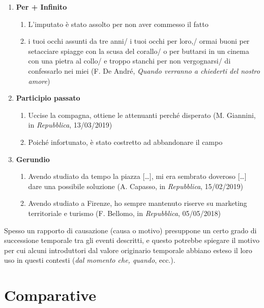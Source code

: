 \documentclass[
  a4paper,
  twoside,
  11pt,
  chapterprefix=false,
  bibliography=totocnumbered,
  listof=flat]{scrbook}
\providecommand{\tightlist}{%
  \setlength{\itemsep}{0pt}\setlength{\parskip}{0pt}}
\begin{document}
\begin{enumerate}
\def\labelenumi{(\arabic{enumi})}
\setcounter{enumi}{74}
\tightlist
\item
  \textbf{Per + Infinito}

  \begin{enumerate}
  \def\labelenumii{\alph{enumii}.}
  \tightlist
  \item
    L'imputato è stato assolto per non aver commesso il fatto
  \item
    i tuoi occhi assunti da tre anni/ i tuoi occhi per loro,/ ormai buoni per setacciare spiagge con la scusa del corallo/ o per buttarsi in un cinema con una pietra al collo/ e troppo stanchi per non vergognarsi/ di confessarlo nei miei (F. De André, \emph{Quando verranno a chiederti del nostro amore})
  \end{enumerate}
\item
  \textbf{Participio passato}

  \begin{enumerate}
  \def\labelenumii{\alph{enumii}.}
  \tightlist
  \item
    Uccise la compagna, ottiene le attenuanti perché disperato (M. Giannini, in \emph{Repubblica}, 13/03/2019)
  \item
    Poiché infortunato, è stato costretto ad abbandonare il campo
  \end{enumerate}
\item
  \textbf{Gerundio}

  \begin{enumerate}
  \def\labelenumii{\alph{enumii}.}
  \tightlist
  \item
    Avendo studiato da tempo la piazza {[}\ldots{]}, mi era sembrato doveroso {[}\ldots{]} dare una possibile soluzione (A. Capasso, in \emph{Repubblica}, 15/02/2019)
  \item
    Avendo studiato a Firenze, ho sempre mantenuto riserve su marketing territoriale e turismo (F. Bellomo, in \emph{Repubblica}, 05/05/2018)
  \end{enumerate}
\end{enumerate}

Spesso un rapporto di causazione (causa o motivo) presuppone un certo grado di successione temporale tra gli eventi descritti, e questo potrebbe spiegare il motivo per cui alcuni introduttori dal valore originario temporale abbiano esteso il loro uso in questi contesti (\emph{dal momento che, quando}, ecc.).

\hypertarget{comparative}{%
\section{Comparative}\label{comparative}}
\end{document}
